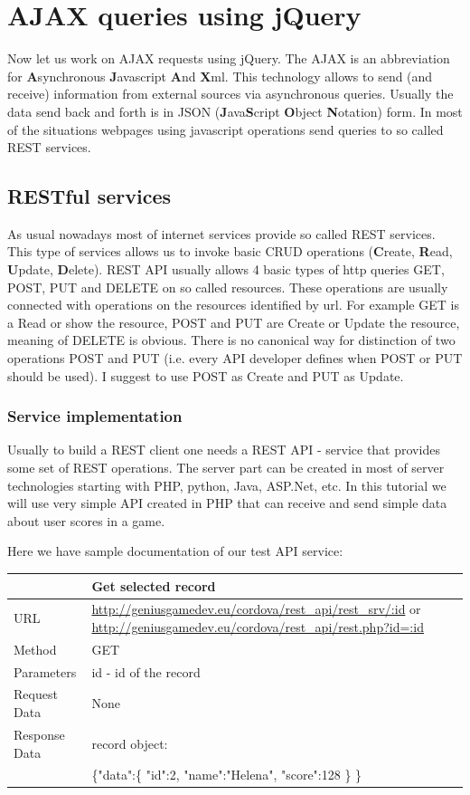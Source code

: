 \chapter{AJAX queries using jQuery }

Now let us work on AJAX requests using jQuery. The AJAX is an abbreviation for \textbf{A}synchronous \textbf{J}avascript \textbf{A}nd \textbf{X}ml. This technology allows to send (and receive) information from external sources via asynchronous queries. Usually the data send back and forth is in JSON (\textbf{J}ava\textbf{S}cript \textbf{O}bject \textbf{N}otation) form. In most of the situations webpages using javascript operations send queries to so called REST services.

\section{RESTful services}
As usual nowadays most of internet services provide so called REST services. This type of services allows us to invoke basic CRUD operations (\textbf{C}reate, \textbf{R}ead, \textbf{U}pdate, \textbf{D}elete). REST API usually allows 4 basic types of http queries GET, POST, PUT and DELETE on so called resources. These operations are usually connected with operations on the resources identified by url. For example GET is a Read or show the resource, POST and PUT are Create or Update the resource, meaning of DELETE is obvious. There is no canonical way for distinction of two operations POST and PUT (i.e. every API developer defines when POST or PUT should be used). I suggest to use POST as Create and PUT as Update.

\subsection{Service implementation}
Usually to build a REST client one needs a REST API - service that provides some set of REST operations. The server part can be created in most of server technologies starting with PHP, python, Java, ASP.Net, etc. In this tutorial we will use very simple API created in PHP that can receive and send simple data about user scores in a game.

Here we have sample documentation of our test API service:

\begin{tabularx}{\textwidth}{|l|X|}
\hline
&\textbf{Get selected record}\\\hline
URL &   \url{http://geniusgamedev.eu/cordova/rest_api/rest_srv/:id} or \url{http://geniusgamedev.eu/cordova/rest_api/rest.php?id=:id}\\\hline
Method  & GET\\\hline
Parameters  & id - id of the record \\\hline
Request Data & None\\\hline
Response Data & record object:\\
&
\{"data":\{
    "id":2,
    "name":"Helena",
    "score":128
    \}
\}
\\\hline
\end{tabularx}

